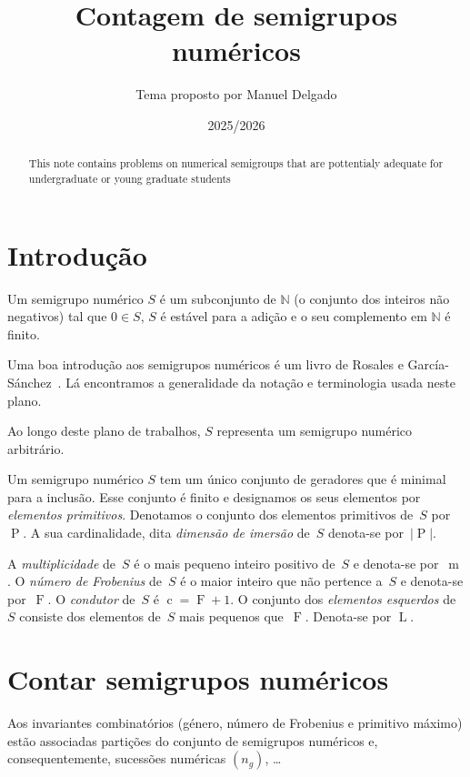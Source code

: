 \documentclass[12pt,a4paper]{article}
\title{Contagem de semigrupos numéricos}
\author{Tema proposto por Manuel Delgado}
\date{2025/2026}
\numberwithin{table}{section}
\numberwithin{figure}{section}
\numberwithin{equation}{section}
\DeclareMathOperator{\Frobeniusoper}{F} %
\DeclareMathOperator{\conductoroper}{c} %
\DeclareMathOperator{\multiplicityoper}{m} %
\DeclareMathOperator{\leftsoper}{L} %
\DeclareMathOperator{\primitivesoper}{P} %
\theoremstyle{definition}
\theoremstyle{remark}
\begin{document}
\maketitle


\begin{abstract}
  
This note contains problems on numerical semigroups that are pottentialy adequate for undergraduate or young graduate students
  
\end{abstract}



\section{Introdução}\label{sec:introducao}

Um semigrupo numérico \(S\) é um subconjunto de \(\mathbb{N}\) (o conjunto dos inteiros não negativos) tal que \(0 \in S\), \(S\) é estável para a adição e o seu complemento em \(\mathbb{N}\) é finito.

Uma boa introdução aos semigrupos numéricos é um livro de Rosales e García-Sánchez~\cite{RosalesGarcia2009Book-Numerical}. Lá encontramos a generalidade da notação e terminologia usada neste plano.

Ao longo deste plano de trabalhos, \(S\) representa um semigrupo numérico arbitrário. 

Um semigrupo numérico \(S\) tem um único conjunto de geradores que é minimal para a inclusão. Esse conjunto é finito e designamos os seus elementos por \emph{elementos primitivos}. Denotamos o conjunto dos elementos primitivos de~\(S\) por~\(\primitivesoper\). A sua cardinalidade, dita \emph{dimensão de imersão} de~\(S\) denota-se por~\(\lvert \primitivesoper\rvert\).

A \emph{multiplicidade} de~\(S\) é o mais pequeno inteiro positivo de~\(S\) e denota-se por~\(\multiplicityoper\).
O \emph{número de Frobenius} de~\(S\) é o maior inteiro que não pertence a~\(S\) e denota-se por~\(\Frobeniusoper\).
O \emph{condutor} de~\(S\) é \(\conductoroper=\Frobeniusoper +1\).
%
O conjunto dos \emph{elementos esquerdos} de~\(S\) consiste dos elementos de~\(S\) mais pequenos que~\(\Frobeniusoper\). Denota-se por \(\leftsoper\).

\section{Contar semigrupos numéricos}\label{sec:contar}
Aos invariantes combinatórios (género, número de Frobenius e primitivo máximo) estão associadas partições do conjunto de semigrupos numéricos e, consequentemente, sucessões numéricas  \(\left(n_g\right)\), …
\end{document}
